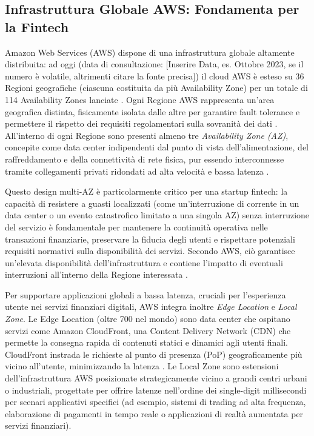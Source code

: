 \subsection{Infrastruttura Globale AWS: Fondamenta per la Fintech}
\label{sec:aws-global-infra-fintech}

Amazon Web Services (AWS) dispone di una infrastruttura globale altamente distribuita: ad oggi (data di consultazione: [Inserire Data, es. Ottobre 2023, se il numero è volatile, altrimenti citare la fonte precisa]) il cloud AWS è esteso su 36 Regioni geografiche (ciascuna costituita da più Availability Zone) per un totale di 114 Availability Zones lanciate \cite{aws-global-infra}. Ogni Regione AWS rappresenta un'area geografica distinta, fisicamente isolata dalle altre per garantire fault tolerance e permettere il rispetto dei requisiti regolamentari sulla sovranità dei dati \cite{aws-global-infra}. All'interno di ogni Regione sono presenti almeno tre \textit{Availability Zone (AZ)}, concepite come data center indipendenti dal punto di vista dell'alimentazione, del raffreddamento e della connettività di rete fisica, pur essendo interconnesse tramite collegamenti privati ridondati ad alta velocità e bassa latenza \cite{aws-global-infra}.

Questo design multi-AZ è particolarmente critico per una startup fintech: la capacità di resistere a guasti localizzati (come un'interruzione di corrente in un data center o un evento catastrofico limitato a una singola AZ) senza interruzione del servizio è fondamentale per mantenere la continuità operativa nelle transazioni finanziarie, preservare la fiducia degli utenti e rispettare potenziali requisiti normativi sulla disponibilità dei servizi. Secondo AWS, ciò garantisce un'elevata disponibilità dell'infrastruttura e contiene l'impatto di eventuali interruzioni all'interno della Regione interessata \cite{aws-global-infra}.

Per supportare applicazioni globali a bassa latenza, cruciali per l'esperienza utente nei servizi finanziari digitali, AWS integra inoltre \textit{Edge Location} e \textit{Local Zone}. Le Edge Location (oltre 700 nel mondo) sono data center che ospitano servizi come Amazon CloudFront, una Content Delivery Network (CDN) che permette la consegna rapida di contenuti statici e dinamici agli utenti finali. CloudFront instrada le richieste al punto di presenza (PoP) geograficamente più vicino all'utente, minimizzando la latenza \cite{aws-cloudfront}. Le Local Zone sono estensioni dell'infrastruttura AWS posizionate strategicamente vicino a grandi centri urbani o industriali, progettate per offrire latenze nell'ordine dei single-digit millisecondi per scenari applicativi specifici (ad esempio, sistemi di trading ad alta frequenza, elaborazione di pagamenti in tempo reale o applicazioni di realtà aumentata per servizi finanziari).

